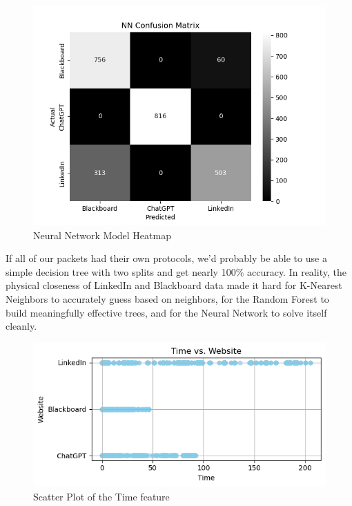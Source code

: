 \documentclass[10pt,sigconf,letterpaper,nonacm]{acmart}
\begin{document}
\begin{figure}
    \centering
    \includegraphics[width=1\linewidth]{Figures_and_Graphs/ConfusionMatrixNN.png}
    \caption{Neural Network Model Heatmap}
    \label{fig:nn_heatmap}
\end{figure}

If all of our packets had their own protocols, we'd probably be able to use a simple decision tree with two splits and get nearly 100\% accuracy.
In reality, the physical closeness of LinkedIn and Blackboard data made it hard for K-Nearest Neighbors to accurately guess based on neighbors, for the Random Forest to build meaningfully effective trees, and for the Neural Network to solve itself cleanly.

\begin{figure}
    \centering
    \includegraphics[width=1\linewidth]{Figures_and_Graphs/time_scatter.png}
    \caption{Scatter Plot of the Time feature}
    \label{fig:time_scatter}
\end{figure}
\end{document}
